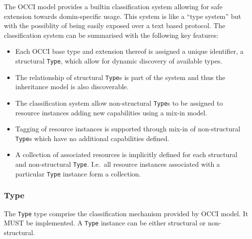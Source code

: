 \documentclass[10pt,a4paper,british]{article}
\newcommand{\hl}{\texttt}
\begin{document}
The OCCI model provides a builtin classification system allowing for safe
extension towards domin-specific usage. This system is like a ``type system''
but with the possiblity of being easily exposed over a text based protocol.
%
The classification system can be summarised with the following key features:
\begin{itemize}
\item Each OCCI base type and extension thereof is assigned a unique
 identifier, a structural \hl{Type}, which allow for dynamic discovery of available
 types.
\item The relationship of structural \hl{Type}s is part of the system and thus
 the inheritance model is also discoverable.
\item The classification system allow non-structural \hl{Type}s to be assigned
 to resource instances adding new capabilities using a mix-in model.
\item Tagging of resource instances is supported through mix-in of
 non-structural \hl{Type}s which have no additional capabilities defined.
\item A collection of associated resources is implicitly defined for each
 structural and non-structural \hl{Type}. I.e.~all resource instances
 associated with a particular \hl{Type} instance form a collection.
\end{itemize}

\subsubsection{Type}

The \hl{Type} type comprise the classification mechanism provided by OCCI
model. It MUST be implemented. A \hl{Type} instance can be either structural or
non-structural.
\end{document}

